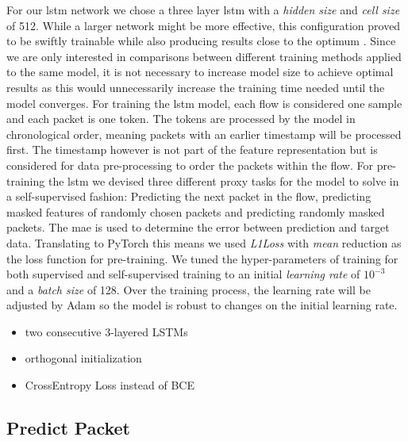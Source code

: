 For our \gls{lstm} network we chose a three layer \gls{lstm} with a \textit{hidden size} and \textit{cell size} of 512. While a larger network might be more effective, this configuration proved to be swiftly trainable while also producing results close to the optimum . Since we are only interested in comparisons between different training methods applied to the same model, it is not necessary to increase model size to achieve optimal results as this would unnecessarily increase the training time needed until the model converges. For training the \gls{lstm} model, each flow is considered one sample and each packet is one token. The tokens are processed by the model in chronological order, meaning packets with an earlier timestamp will be processed first. The timestamp however is not part of the feature representation but is considered for data pre-processing to order the packets within the flow. For pre-training the \gls{lstm} we devised three different proxy tasks for the model to solve in a self-supervised fashion: Predicting the next packet in the flow, predicting masked features of randomly chosen packets and predicting randomly masked packets. The \gls{mae} is used to determine the error between prediction and target data. Translating to PyTorch this means we used \textit{L1Loss} with \textit{mean} reduction as the loss function for pre-training. We tuned the hyper-parameters of training for both supervised and self-supervised training to an initial \textit{learning rate} of $10^{-3}$ and a \textit{batch size} of 128. Over the training process, the learning rate will be adjusted by Adam so the model is robust to changes on the initial learning rate. 


\begin{itemize}
	\item two consecutive 3-layered LSTMs
	\item orthogonal initialization
	\item CrossEntropy Loss instead of BCE
\end{itemize}

\subsection{Predict Packet} \label{sec:experiments_lstm_predict_packet}

